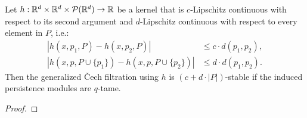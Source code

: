 \begin{theorem}
    Let $h : \mathbb{R}^d \times \mathbb{R}^d \times \mathcal{P}(\mathbb{R}^d) \to \mathbb{R}$ be a kernel that
    is $c$-Lipschitz continuous with respect to its second argument and
    $d$-Lipschitz continuous with respect to every element in $P$, i.e.:
    \begin{align}
        |h(x, p_1, P) - h(x, p_2, P)| & \leq c \cdot d(p_1, p_2), \\
        |h(x, p, P \cup \{p_1\}) - h(x, p, P \cup \{p_2\})| & \leq d \cdot d(p_1, p_2).
    \end{align}
    Then the
    generalized \v{C}ech filtration using $h$ is $(c + d \cdot |P|)$-stable if
    the induced persistence modules are $q$-tame.
\end{theorem}
\begin{proof}
    \todo{}
\end{proof}
